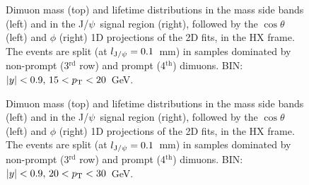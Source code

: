 \documentclass[12pt]{article}
\newcommand{\JPsi}{J/$\psi$}
\begin{document}
\begin{figure}[htbp]
\centering
{}
\caption{Dimuon mass (top) and lifetime distributions in the mass side bands 
(left) and in the \JPsi\ signal region (right), followed by the
$\cos\theta$ (left) and $\phi$ (right) 1D projections of the 2D fits,
in the HX frame. The events are split (at $l_{{\rm J}/\psi} = 0.1$~mm) 
in samples dominated by non-prompt (3$^\mathrm{rd}$ row) and 
prompt (4$^\mathrm{th}$) dimuons. BIN: $|y|<0.9,\, 15 < p_{\rm T} < 20$~GeV.}
\end{figure}
\clearpage

\begin{figure}[htbp]
\centering
{}
\caption{Dimuon mass (top) and lifetime distributions in the mass side bands 
(left) and in the \JPsi\ signal region (right), followed by the
$\cos\theta$ (left) and $\phi$ (right) 1D projections of the 2D fits,
in the HX frame. The events are split (at $l_{{\rm J}/\psi} = 0.1$~mm) 
in samples dominated by non-prompt (3$^\mathrm{rd}$ row) and 
prompt (4$^\mathrm{th}$) dimuons. BIN: $|y|<0.9,\, 20 < p_{\rm T} < 30$~GeV.}
\end{figure}
\clearpage

\end{document}

